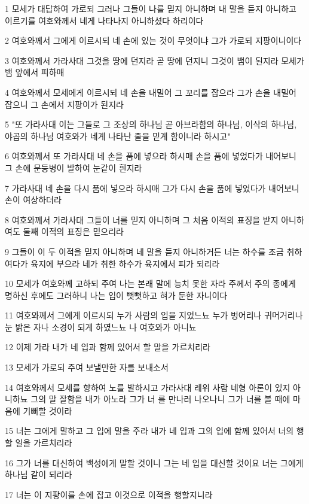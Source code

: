 \par 1 모세가 대답하여 가로되 그러나 그들이 나를 믿지 아니하며 내 말을 듣지 아니하고 이르기를 여호와께서 네게 나타나지 아니하셨다 하리이다
\par 2 여호와께서 그에게 이르시되 네 손에 있는 것이 무엇이냐 그가 가로되 지팡이니이다
\par 3 여호와께서 가라사대 그것을 땅에 던지라 곧 땅에 던지니 그것이 뱀이 된지라 모세가 뱀 앞에서 피하매
\par 4 여호와께서 모세에게 이르시되 네 손을 내밀어 그 꼬리를 잡으라 그가 손을 내밀어 잡으니 그 손에서 지팡이가 된지라
\par 5 "또 가라사대 이는 그들로 그 조상의 하나님 곧 아브라함의 하나님, 이삭의 하나님, 야곱의 하나님 여호와가 네게 나타난 줄을 믿게 함이니라 하시고"
\par 6 여호와께서 또 가라사대 네 손을 품에 넣으라 하시매 손을 품에 넣었다가 내어보니 그 손에 문둥병이 발하여 눈같이 흰지라
\par 7 가라사대 네 손을 다시 품에 넣으라 하시매 그가 다시 손을 품에 넣었다가 내어보니 손이 여상하더라
\par 8 여호와께서 가라사대 그들이 너를 믿지 아니하며 그 처음 이적의 표징을 받지 아니하여도 둘째 이적의 표징은 믿으리라
\par 9 그들이 이 두 이적을 믿지 아니하며 네 말을 듣지 아니하거든 너는 하수를 조금 취하여다가 육지에 부으라 네가 취한 하수가 육지에서 피가 되리라
\par 10 모세가 여호와께 고하되 주여 나는 본래 말에 능치 못한 자라 주께서 주의 종에게 명하신 후에도 그러하니 나는 입이 뻣뻣하고 혀가 둔한 자니이다
\par 11 여호와께서 그에게 이르시되 누가 사람의 입을 지었느뇨 누가 벙어리나 귀머거리나 눈 밝은 자나 소경이 되게 하였느뇨 나 여호와가 아니뇨
\par 12 이제 가라 내가 네 입과 함께 있어서 할 말을 가르치리라
\par 13 모세가 가로되 주여 보낼만한 자를 보내소서
\par 14 여호와께서 모세를 향하여 노를 발하시고 가라사대 레위 사람 네형 아론이 있지 아니하뇨 그의 말 잘함을 내가 아노라 그가 너 를 만나러 나오나니 그가 너를 볼 때에 마음에 기뻐할 것이라
\par 15 너는 그에게 말하고 그 입에 말을 주라 내가 네 입과 그의 입에 함께 있어서 너의 행할 일을 가르치리라
\par 16 그가 너를 대신하여 백성에게 말할 것이니 그는 네 입을 대신할 것이요 너는 그에게 하나님 같이 되리라
\par 17 너는 이 지팡이를 손에 잡고 이것으로 이적을 행할지니라
